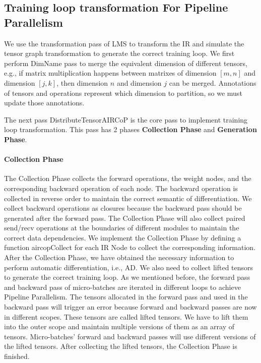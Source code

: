 \documentclass[sigplan, nonacm]{acmart}\settopmatter{printfolios=true,printccs=false,printacmref=false}
\begin{document}
\subsection{Training loop transformation For Pipeline Parallelism}
We use the transformation pass of LMS to transform the IR and simulate the tensor graph transformation to generate the correct training loop. We first perform DimName pass to merge the equivalent dimension of different tensors, e.g., if matrix multiplication happens between matrixes of dimension $[m, n]$ and dimension $[j,k]$, then dimension $n$ and dimension $j$ can be merged.  Annotations of tensors and operations represent which dimension to partition, so we must update those annotations. \par
The next pass DistributeTensorAIRCoP is the core pass to implement training loop transformation. This pass has 2 phases \textbf{Collection Phase} and \textbf{Generation Phase}.\par
\paragraph{Collection Phase}
The Collection Phase collects the forward operations, the weight nodes, and the corresponding backward operation of each node. The backward operation is collected in reverse order to maintain the correct semantic of differentiation. We collect backward operations as closures because the backward pass should be generated after the forward pass. The Collection Phase will also collect paired send/recv operations at the boundaries of different modules to maintain the correct data dependencies. We implement the Collection Phase by defining a function aircopCollect for each IR Node to collect the corresponding information. After the Collection Phase, we have obtained the necessary information to perform automatic differentiation, i.e., AD. We also need to collect lifted tensors to generate the correct training loop. As we mentioned before, the forward pass and backward pass of micro-batches are iterated in different loops to achieve Pipeline Parallelism. The tensors allocated in the forward pass and used in the backward pass will trigger an error because forward and backward passes are now in different scopes. These tensors are called lifted tensors. We have to lift them into the outer scope and maintain multiple versions of them as an array of tensors. Micro-batches' forward and backward passes will use different versions of the lifted tensors. After collecting the lifted tensors, the Collection Phase is finished.\par
\end{document}

